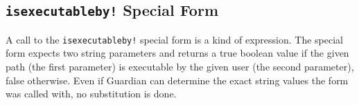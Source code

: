 
\subsection{\texttt{isexecutableby!} Special Form}
{
	A call to the \texttt{isexecutableby!} special form
	is a kind of expression.
	The special form expects two string parameters and returns a true boolean
	value if the given path (the first parameter) is executable by
	the given user (the second parameter), false
	otherwise.
	Even if Guardian can determine the exact string values the form was
	called with, no substitution is done.
}
